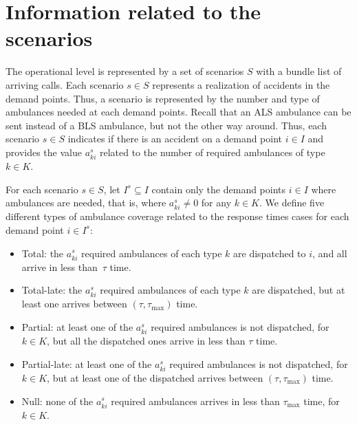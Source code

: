 \section{Information related to the scenarios}
   
The operational level is represented by a set of scenarios $S$ with a bundle list of arriving calls. Each scenario $s \in S$ represents a realization of accidents in the demand points.  Thus, a scenario is represented by the number and type of ambulances needed at each demand points.
Recall that an ALS ambulance can be sent instead of a BLS ambulance, but not the other way around. Thus, each scenario $s\in S$ indicates if there is an accident on a demand point $i \in I$ and provides the value $a_{ki}^s$ related to the number of required ambulances of type $k \in K$.  

For each scenario $s\in S$, let $I^s\subseteq I$ contain only the demand points $i\in I$ where ambulances are needed, that is, where $a_{ki}^s\neq 0 $ for any $k\in K$. We define five different types of ambulance coverage related to the response times cases for each demand point $i\in I^s$:
\begin{itemize}
    \item Total: the $a_{ki}^s$ required ambulances of each type $k$ are dispatched to $i$, and all arrive in less than~$\tau$ time.
    \item Total-late: the $a_{ki}^s$ required ambulances of each type $k$ are dispatched, but at least one arrives between $(\tau,\tau_{\max})$ time.
    \item Partial: at least one of the $a_{ki}^s$ required ambulances is not dispatched, for $k\in K$, but all the dispatched ones arrive in less than $\tau$ time.
    \item Partial-late: at least one of the $a_{ki}^s$ required ambulances is not dispatched, for $k\in K$, but at least one of the dispatched arrives between $(\tau,\tau_{\max})$ time.
    \item Null: none of the $a_{ki}^s$ required ambulances arrives in less than $\tau_{\max}$ time, for $k\in K$.
\end{itemize}


